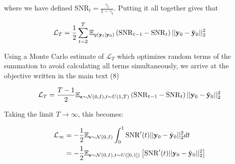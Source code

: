 

where we have defined $\mathrm{SNR}_{t} = \frac{\gamma_{t}}{1-\gamma_{t}}$. Putting it all together gives that 

\begin{equation}
\mathcal{L}_{T} = \frac{1}{2}\sum_{t=2}^{T} \mathbb{E}_{q(\bold{y}_{t}\lvert\bold{y}_{0})}\left(\mathrm{SNR}_{t-1}-\mathrm{SNR}_{t}\right)\lvert\lvert \bold{y}_{0} - \hat{\bold{y}}_{0} \lvert\lvert_{2}^{2}
\end{equation}

Using a Monte Carlo estimate of $\mathcal{L}_{T}$ \parencite{Kingma2023} which optimizes random terms of the summation to avoid calculating all terms simultaneously, we arrive at the objective written in the main text (8)


\begin{equation}
\mathcal{L}_{T} = \frac{T-1}{2} \mathbb{E}_{\boldsymbol{\epsilon}\sim \mathcal{N}(0,I),t\sim U(1,T)}\left(\mathrm{SNR}_{t-1}-\mathrm{SNR}_{t}\right)\lvert\lvert \bold{y}_{0} - \hat{\bold{y}}_{0} \lvert\lvert_{2}^{2}
\end{equation}

Taking the limit $T\rightarrow\infty$, this becomes:

\begin{align*}
\mathcal{L}_\infty &= -\frac{1}{2} \mathbb{E}_{\boldsymbol{\epsilon} \sim \mathcal{N}(0,I)} \int_{0}^{1} \mathrm{SNR}'(t) \lvert\lvert \bold{y}_{0} - \hat{\bold{y}}_{0} \lvert\lvert_{2}^{2} dt \\
&= -\frac{1}{2} \mathbb{E}_{\boldsymbol{\epsilon} \sim \mathcal{N}(0,I),t \sim U([0,1])} \left[\mathrm{SNR}'(t) \lvert\lvert \bold{y}_{0} - \hat{\bold{y}}_{0} \lvert\lvert_{2}^{2}\right]
\end{align*}

